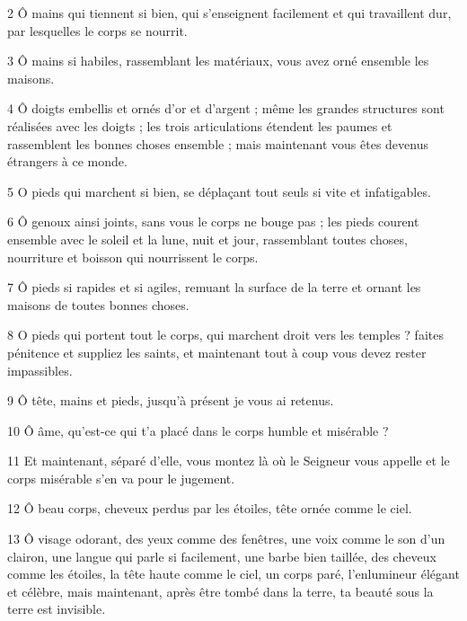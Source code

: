 \par 2 Ô mains qui tiennent si bien, qui s'enseignent facilement et qui travaillent dur, par lesquelles le corps se nourrit.

\par 3 Ô mains si habiles, rassemblant les matériaux, vous avez orné ensemble les maisons.

\par 4 Ô doigts embellis et ornés d'or et d'argent ; même les grandes structures sont réalisées avec les doigts ; les trois articulations étendent les paumes et rassemblent les bonnes choses ensemble ; mais maintenant vous êtes devenus étrangers à ce monde.

\par 5 O pieds qui marchent si bien, se déplaçant tout seuls si vite et infatigables.

\par 6 Ô genoux ainsi joints, sans vous le corps ne bouge pas ; les pieds courent ensemble avec le soleil et la lune, nuit et jour, rassemblant toutes choses, nourriture et boisson qui nourrissent le corps.

\par 7 Ô pieds si rapides et si agiles, remuant la surface de la terre et ornant les maisons de toutes bonnes choses.

\par 8 O pieds qui portent tout le corps, qui marchent droit vers les temples ? faites pénitence et suppliez les saints, et maintenant tout à coup vous devez rester impassibles.

\par 9 Ô tête, mains et pieds, jusqu'à présent je vous ai retenus.

\par 10 Ô âme, qu'est-ce qui t'a placé dans le corps humble et misérable ?

\par 11 Et maintenant, séparé d'elle, vous montez là où le Seigneur vous appelle et le corps misérable s'en va pour le jugement.

\par 12 Ô beau corps, cheveux perdus par les étoiles, tête ornée comme le ciel.

\par 13 Ô visage odorant, des yeux comme des fenêtres, une voix comme le son d'un clairon, une langue qui parle si facilement, une barbe bien taillée, des cheveux comme les étoiles, la tête haute comme le ciel, un corps paré, l'enlumineur élégant et célèbre, mais maintenant, après être tombé dans la terre, ta beauté sous la terre est invisible.

